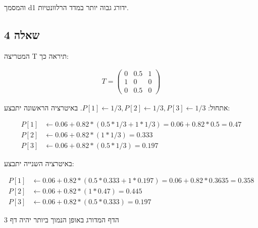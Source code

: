 \documentclass{article}
\begin{document}
\begin{hebrew}

    והמסמך d1 ידורג גבוה יותר במדד הרלוונטיות.

\end{hebrew}

\pagebreak

\begin{hebrew}
    \section*{שאלה 4}
    המטריצה T תיראה כך:
\end{hebrew}
\begin{align*}
    T=\begin{pmatrix}
          0 & 0.5 & 1 \\
          1 & 0   & 0 \\
          0 & 0.5 & 0
      \end{pmatrix}
\end{align*}
\begin{hebrew}
    אתחול: $P[1]\leftarrow 1/3, P[2]\leftarrow 1/3, P[3]\leftarrow 1/3$.
    באיטרציה הראשונה יתבצע:
\end{hebrew}

\begin{align*}
    P[1] & \leftarrow 0.06+ 0.82 * (0.5 * 1/3 + 1 * 1/3)=0.06 + 0.82 * 0.5 = 0.47 \\
    P[2] & \leftarrow 0.06 + 0.82 * (1 * 1/3)=0.333                               \\
    P[3] & \leftarrow 0.06 + 0.82 * (0.5 * 1/3) = 0.197
\end{align*}

\begin{hebrew}
    באיטרציה השנייה יתבצע:
\end{hebrew}

\begin{align*}
    P[1] & \leftarrow 0.06+ 0.82 * (0.5 * 0.333 + 1 * 0.197)=0.06 + 0.82 * 0.3635 = 0.358 \\
    P[2] & \leftarrow 0.06 + 0.82 * (1 * 0.47)=0.445                                      \\
    P[3] & \leftarrow 0.06 + 0.82 * (0.5 * 0.333) = 0.197
\end{align*}

\begin{hebrew}
    הדף המדורג באופן הנמוך ביותר יהיה דף 3
\end{hebrew}
\end{document}
